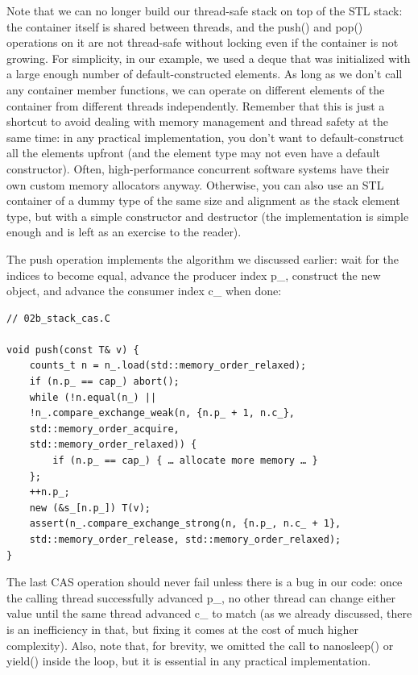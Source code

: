 Note that we can no longer build our thread-safe stack on top of the STL stack: the container itself is shared between threads, and the push() and pop() operations on it are not thread-safe without locking even if the container is not growing. For simplicity, in our example, we used a deque that was initialized with a large enough number of default-constructed elements. As long as we don't call any container member functions, we can operate on different elements of the container from different threads independently. Remember that this is just a shortcut to avoid dealing with memory management and thread safety at the same time: in any practical implementation, you don't want to default-construct all the elements upfront (and the element type may not even have a default constructor). Often, high-performance concurrent software systems have their own custom memory allocators anyway. Otherwise, you can also use an STL container of a dummy type of the same size and alignment as the stack element type, but with a simple constructor and destructor (the implementation is simple enough and is left as an exercise to the reader).

The push operation implements the algorithm we discussed earlier: wait for the indices to become equal, advance the producer index p\_, construct the new object, and advance the consumer index c\_ when done:

\begin{lstlisting}[style=styleCXX]
// 02b_stack_cas.C
	
void push(const T& v) {
	counts_t n = n_.load(std::memory_order_relaxed);
	if (n.p_ == cap_) abort();
	while (!n.equal(n_) ||
	!n_.compare_exchange_weak(n, {n.p_ + 1, n.c_},
	std::memory_order_acquire,
	std::memory_order_relaxed)) {
		if (n.p_ == cap_) { … allocate more memory … }
	};
	++n.p_;
	new (&s_[n.p_]) T(v);
	assert(n_.compare_exchange_strong(n, {n.p_, n.c_ + 1},
	std::memory_order_release, std::memory_order_relaxed);
}
\end{lstlisting}

The last CAS operation should never fail unless there is a bug in our code: once the calling thread successfully advanced p\_, no other thread can change either value until the same thread advanced c\_ to match (as we already discussed, there is an inefficiency in that, but fixing it comes at the cost of much higher complexity). Also, note that, for brevity, we omitted the call to nanosleep() or yield() inside the loop, but it is essential in any practical implementation.

